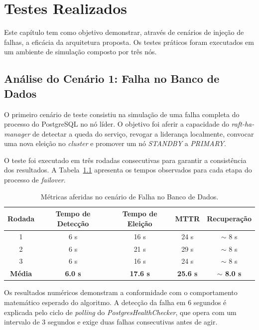 \chapter{Testes Realizados}
\label{cap:resultados}

Este capítulo tem como objetivo demonstrar, através de cenários de injeção de falhas, a eficácia da arquitetura proposta. Os testes práticos foram executados em um ambiente de simulação composto por três nós. 

\section{Análise do Cenário 1: Falha no Banco de Dados}

    O primeiro cenário de teste consistiu na simulação de uma falha completa do processo do PostgreSQL no nó líder. O objetivo foi aferir a capacidade do \textit{raft-ha-manager} de detectar a queda do serviço, revogar a liderança localmente, convocar uma nova eleição no \textit{cluster} e promover um nó \textit{STANDBY} a \textit{PRIMARY}.
    
    O teste foi executado em três rodadas consecutivas para garantir a consistência dos resultados. A Tabela~\ref{tab:resultados_crash} apresenta os tempos observados para cada etapa do processo de \textit{failover}.
    
    \begin{table}[htb]
        \ABNTEXfontereduzida
        \centering
        \caption[Métricas da Falha no Banco de Dados]{Métricas aferidas no cenário de Falha no Banco de Dados.}
        \label{tab:resultados_crash}
        \begin{tabular}{c|c|c|c|c}
            \textbf{Rodada} & \textbf{Tempo de Detecção} & \textbf{Tempo de Eleição} & \textbf{MTTR} & \textbf{Recuperação} \\ \hline \hline
            1 & 6 s & 16 s & 24 s & $\sim$ 8 s \\ \hline
            2 & 6 s & 21 s & 29 s & $\sim$ 8 s \\ \hline
            3 & 6 s & 16 s & 24 s & $\sim$ 8 s \\ \hline
            \textbf{Média} & \textbf{6.0 s} & \textbf{17.6 s} & \textbf{25.6 s} & \textbf{$\sim$ 8.0 s} \\
        \end{tabular}
    \end{table}
    
    Os resultados numéricos demonstram a conformidade com o comportamento matemático esperado do algoritmo. A detecção da falha em 6 segundos é explicada pelo ciclo de \textit{polling} do \textit{PostgresHealthChecker}, que opera com um intervalo de 3 segundos e exige duas falhas consecutivas antes de agir. 
    
